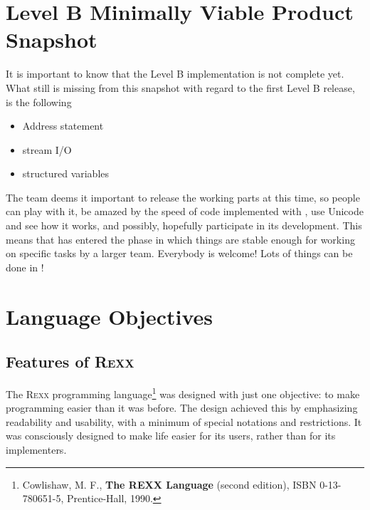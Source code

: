\section{Level B Minimally Viable Product Snapshot}
It is important to know that the Level B implementation is not complete
yet. What still is missing from this snapshot with
regard to the first \crexx{} Level B release, is the following
\begin{itemize}
\item Address statement
\item stream I/O
\item structured variables
\end{itemize}

The team deems it important to release the working parts at this time,
so people can play with it, be amazed by the speed of code implemented
with \rexx{}, use Unicode and see how it works, and possibly,
hopefully participate in its development. This means that \crexx{} has
entered the phase in which things are stable enough for working on
specific tasks by a larger team. Everybody is welcome! Lots of things
can be done in \rexx{}!

\section{Language Objectives}
\subsection{Features of R\textsc{exx}}
The R\textsc{exx} programming language\footnote{Cowlishaw, M. F., \textbf{The REXX Language} (second edition), ISBN 0-13-780651-5, Prentice-Hall, 1990.} was designed with just one objective: to make programming easier than it was before. The design achieved this by emphasizing readability and usability, with a minimum of special notations and restrictions. It was consciously designed to make life easier for its users, rather than for its implementers.

